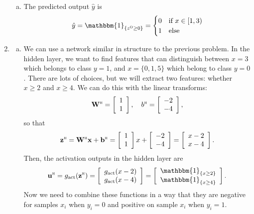 \documentclass[11pt]{article}
\newcommand{\bbf}{\mathbf{b}}
\newcommand{\ubf}{\mathbf{u}}
\newcommand{\xbf}{\mathbf{x}}
\newcommand{\zbf}{\mathbf{z}}
\newcommand{\Wbf}{\mathbf{W}}
\newcommand{\indic}[1]{\mathbbm{1}_{ \{ {#1} \} }}
\def\hid{\textsc{\tiny H}}
\def\out{\textsc{\tiny O}}
\begin{document}
\begin{enumerate}
\begin{enumerate}[(a)]
\item The predicted output $\hat{y}$ is
\[
    \hat{y} = \indic{z^\out \geq 0} =
    \begin{cases}
        0 & \mbox{if } x \in [1,3) \\
        1 & \mbox{else}
     \end{cases}
\]
\end{enumerate}

\item \label{prob:nncreate}
\begin{enumerate}[(a)]
\item
We can use a network similar in structure to the previous problem.
In the hidden layer, we want to find features that can distinguish between
$x=3$ which belongs to class $y=1$, and $x=\{0,1,5\}$ which belong to class $y=0$.
There are lots of choices, but we will extract two features: whether $x \geq 2$
and $x \geq 4$.  We can do this with the linear transforms:
\[
    \Wbf^\hid = \left[ \begin{array}{c} 1 \\ 1 \end{array} \right], \quad
    b^\hid = \left[ \begin{array}{c} -2 \\ -4 \end{array} \right],
\]
so that
\[
    \zbf^\hid = \Wbf^\hid\xbf + \bbf^\hid =
    \left[ \begin{array}{c} 1 \\ 1 \end{array} \right]x +
    \left[ \begin{array}{c} -2 \\ -4 \end{array} \right] =
    \left[ \begin{array}{c} x-2 \\ x-4 \end{array} \right].
\]
Then, the activation outputs in the hidden layer are
\[
    \ubf^\hid = g_{\rm act}(\zbf^\hid) =
     \left[ \begin{array}{c} g_{\rm act}(x-2) \\ g_{\rm act}(x-4) \end{array} \right]
     =
     \left[ \begin{array}{c} \indic{x \geq 2} \\ \indic{x \geq 4} \end{array} \right].
\]
Now we need to combine these functions in a way that they are negative
for samples $x_i$ when $y_i=0$ and positive on sample $x_i$ when $y_i=1$.

\end{enumerate}
\end{enumerate}
\end{document}
